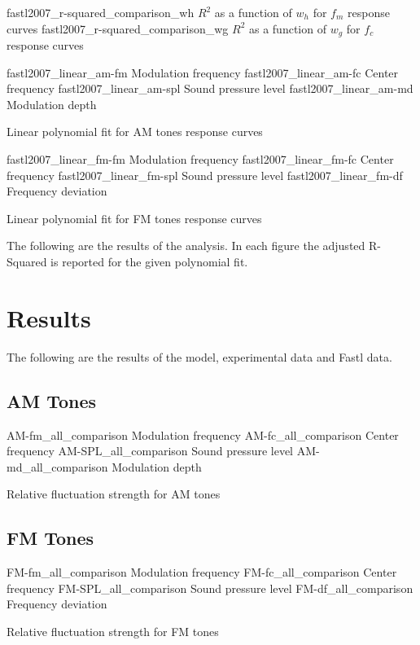 \documentclass{article}
\begin{document}
\myfigurepair%
  {fastl2007_r-squared_comparison_wh}
  {$R^2$ as a function of $w_h$ for $f_m$ response curves}
  {fastl2007_r-squared_comparison_wg}
  {$R^2$ as a function of $w_g$ for $f_c$ response curves}

\myfigurequad%
  {fastl2007_linear_am-fm}
  {Modulation frequency}
  {fastl2007_linear_am-fc}
  {Center frequency}
  {fastl2007_linear_am-spl}
  {Sound pressure level}
  {fastl2007_linear_am-md}
  {Modulation depth}
  {
    \caption{Linear polynomial fit for AM tones response curves}
    \label{fig:fastl2007_linear_am}
  }

\myfigurequad%
  {fastl2007_linear_fm-fm}
  {Modulation frequency}
  {fastl2007_linear_fm-fc}
  {Center frequency}
  {fastl2007_linear_fm-spl}
  {Sound pressure level}
  {fastl2007_linear_fm-df}
  {Frequency deviation}
  {
    \caption{Linear polynomial fit for FM tones response curves}
    \label{fig:fastl2007_linear_fm}
  }

The following are the results of the analysis. In each figure the adjusted
R-Squared is reported for the given polynomial fit.

\section{Results}
\label{sec:results}

The following are the results of the model, experimental data and Fastl data.

\begin{comparison}

\subsection{AM Tones}
\label{subsec:results_am_tones}

\myfigurequad%
  {AM-fm_all_comparison}
  {Modulation frequency}
  {AM-fc_all_comparison}
  {Center frequency}
  {AM-SPL_all_comparison}
  {Sound pressure level}
  {AM-md_all_comparison}
  {Modulation depth}
  {
    \caption{Relative fluctuation strength for AM tones}
    \label{fig:AM_all_comparison}
  }

\subsection{FM Tones}
\label{subsec:results_fm_tones}

\myfigurequad%
  {FM-fm_all_comparison}
  {Modulation frequency}
  {FM-fc_all_comparison}
  {Center frequency}
  {FM-SPL_all_comparison}
  {Sound pressure level}
  {FM-df_all_comparison}
  {Frequency deviation}
  {
    \caption{Relative fluctuation strength for FM tones}
    \label{fig:FM_all_comparison}
  }

\end{comparison}
\end{document}
